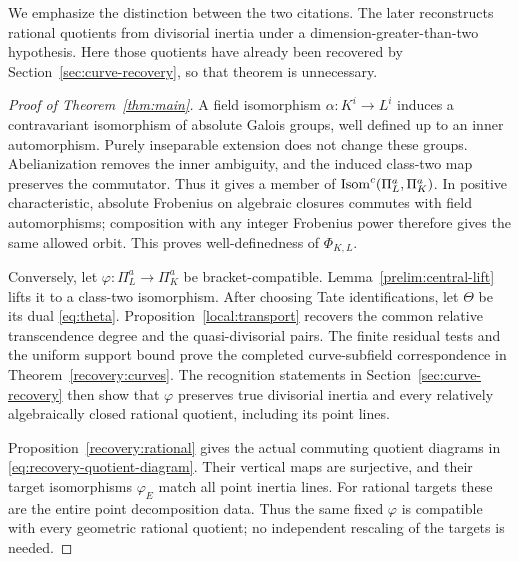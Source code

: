 We emphasize the distinction between the two citations.  The later
\cite[Theorem~1.1]{Pop2018} reconstructs rational quotients from
divisorial inertia under a dimension-greater-than-two hypothesis.
Here those quotients have already been recovered by
Section~\ref{sec:curve-recovery}, so that theorem is unnecessary.

\begin{proof}[Proof of Theorem~\ref{thm:main}]
A field isomorphism $\alpha:K^i\to L^i$ induces a contravariant
isomorphism of absolute Galois groups, well defined up to an inner
automorphism.  Purely inseparable extension does not change these
groups.  Abelianization removes the inner ambiguity, and the induced
class-two map preserves the commutator.  Thus it gives a member of
$\operatorname{Isom}^c(\Pi_L^a,\Pi_K^a)$.  In positive characteristic, absolute
Frobenius on algebraic closures commutes with field automorphisms;
composition with any integer Frobenius power therefore gives the same
allowed orbit.  This proves well-definedness of $\Phi_{K,L}$.

Conversely, let $\varphi:\Pi_L^a\to\Pi_K^a$ be bracket-compatible.
Lemma~\ref{prelim:central-lift} lifts it to a class-two isomorphism.
After choosing Tate identifications, let $\Theta$ be its dual
\eqref{eq:theta}.  Proposition~\ref{local:transport} recovers the common
relative transcendence degree and the quasi-divisorial pairs.
The finite residual tests and the uniform support bound prove the
completed curve-subfield correspondence in
Theorem~\ref{recovery:curves}.  The recognition statements in
Section~\ref{sec:curve-recovery} then show that $\varphi$ preserves true
divisorial inertia and every relatively algebraically closed rational
quotient, including its point lines.

Proposition~\ref{recovery:rational} gives the actual commuting
quotient diagrams in \eqref{eq:recovery-quotient-diagram}.
Their vertical maps are surjective, and their target isomorphisms
$\varphi_E$ match all point inertia lines.  For rational targets these
are the entire point decomposition data.  Thus the same fixed
$\varphi$ is compatible with every geometric rational quotient;
no independent rescaling of the targets is needed.


\end{proof}
